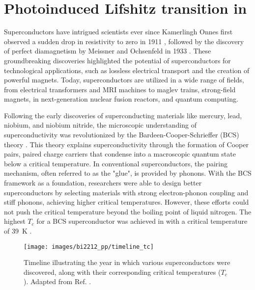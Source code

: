 \renewcommand{\chaptercolor}{custom_copper}
\chapter{Photoinduced Lifshitz transition in }
\label{ch:bi2212}

Superconductors have intrigued scientists ever since Kamerlingh Onnes first observed a sudden drop in resistivity to zero in 1911 \cite{van_delft_discovery_2010}, followed by the discovery of perfect diamagnetism by Meissner and Ochsenfeld in 1933 \cite{meissner_neuer_1933}.
These groundbreaking discoveries highlighted the potential of superconductors for technological applications, such as lossless electrical transport and the creation of powerful magnets.
Today, superconductors are utilized in a wide range of fields, from electrical transformers and MRI machines to maglev trains, strong-field magnets, in next-generation nuclear fusion reactors, and quantum computing.

Following the early discoveries of superconducting materials like mercury, lead, niobium, and niobium nitride, the microscopic understanding of superconductivity was revolutionized by the Bardeen-Cooper-Schrieffer (BCS) theory \cite{bardeen_theory_1957}.
This theory explains superconductivity through the formation of Cooper pairs, paired charge carriers that condense into a macroscopic quantum state below a critical temperature.
In conventional superconductors, the pairing mechanism, often referred to as the "glue", is provided by phonons.
With the BCS framework as a foundation, researchers were able to design better superconductors by selecting materials with strong electron-phonon coupling and stiff phonons, achieving higher critical temperatures.
However, these efforts could not push the critical temperature beyond the boiling point of liquid nitrogen.
The highest $T_c$ for a BCS superconductor was achieved in  with a critical temperature of \qty{39}{\kelvin} \cite{nagamatsu_superconductivity_2001}.

\begin{figure}
	\centering
	\texttt{[image: images/bi2212\_pp/timeline\_tc]}
	\caption{Timeline illustrating the year in which various superconductors were discovered, along with their corresponding critical temperatures ($T_c$). Adapted from Ref. \cite{pjray_english_2015}.}
	\label{fig:timeline}
\end{figure}

